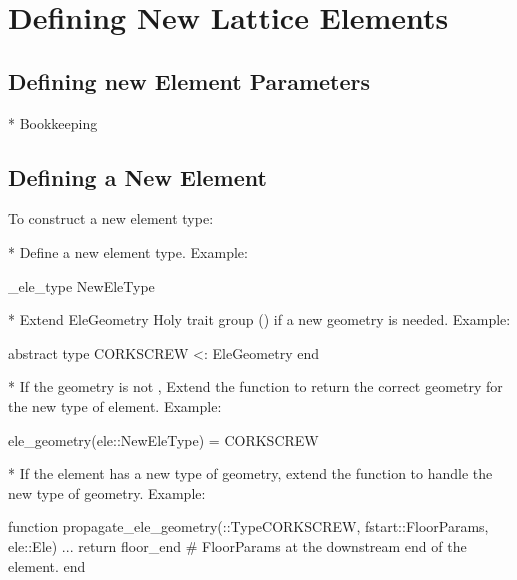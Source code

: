 \chapter{Defining New Lattice Elements}
\label{c:new.ele}

\section{Defining new Element Parameters}

* Bookkeeping 

\section{Defining a New Element}
\label{s:new.ele}

To construct a new element type:

* Define a new element type. Example:
\begin{example}
  \@construct_ele_type NewEleType
\end{example}

* Extend EleGeometry Holy trait group () if a new geometry is needed. Example:
\begin{example}
  abstract type CORKSCREW <: EleGeometry end
\end{example}

* If the geometry is not , Extend the  function to return the 
correct geometry for the new type of element. Example:
\begin{example}
  ele_geometry(ele::NewEleType) = CORKSCREW
\end{example}

* If the element has a new type of geometry, extend the  function
to handle the new type of geometry. Example:
\begin{example}
  function propagate_ele_geometry(::Type{CORKSCREW}, fstart::FloorParams, ele::Ele)
    ...
    return floor_end  # FloorParams at the downstream end of the element.
  end
\end{example}



